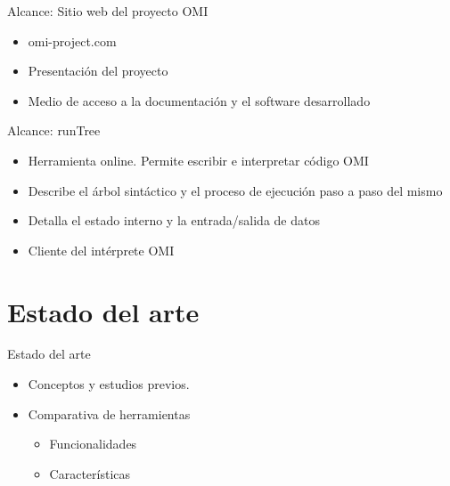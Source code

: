 \documentclass[spanish]{beamer}
\begin{document}
\begin{frame}{Alcance: Sitio web del proyecto OMI}
    \begin{itemize}
      \item omi-project.com
      \item Presentación del proyecto
      \item Medio de acceso a la documentación y el software desarrollado
   \end{itemize}
\end{frame}

\begin{frame}{Alcance: runTree}
    \begin{itemize}
      \item Herramienta online. Permite escribir e interpretar código OMI
      \item Describe el árbol sintáctico y el proceso de ejecución paso a paso del mismo
      \item Detalla el estado interno y la entrada/salida de datos
      \item Cliente del intérprete OMI
   \end{itemize}
\end{frame}

\section{Estado del arte}
\begin{frame}{Estado del arte}
    \begin{itemize}
      \item Conceptos y estudios previos.
      \item Comparativa de herramientas 
      \begin{itemize}
      \item Funcionalidades
      \item Características
      \end{itemize}
   \end{itemize}
\end{frame}
\end{document}
